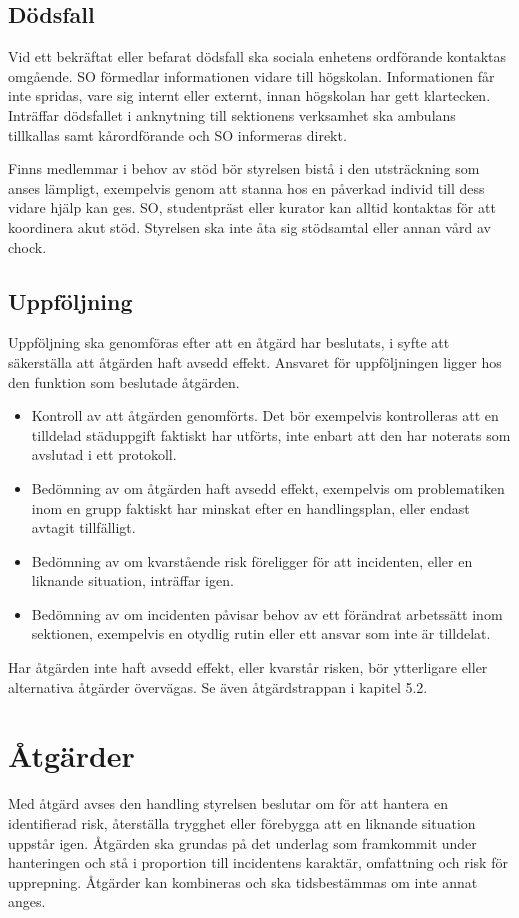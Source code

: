 \subsection{Dödsfall}
Vid ett bekräftat eller befarat dödsfall ska sociala enhetens ordförande kontaktas omgående. SO förmedlar informationen vidare till högskolan. Informationen får inte spridas, vare sig internt eller externt, innan högskolan har gett klartecken. Inträffar dödsfallet i anknytning till sektionens verksamhet ska ambulans tillkallas samt kårordförande och SO informeras direkt.

Finns medlemmar i behov av stöd bör styrelsen bistå i den utsträckning som anses lämpligt, exempelvis genom att stanna hos en påverkad individ till dess vidare hjälp kan ges. SO, studentpräst eller kurator kan alltid kontaktas för att koordinera akut stöd. Styrelsen ska inte åta sig stödsamtal eller annan vård av chock.

\subsection{Uppföljning}
Uppföljning ska genomföras efter att en åtgärd har beslutats, i syfte att säkerställa att åtgärden haft avsedd effekt. Ansvaret för uppföljningen ligger hos den funktion som beslutade åtgärden.
\begin{itemize}
\item Kontroll av att åtgärden genomförts. Det bör exempelvis kontrolleras att en tilldelad städuppgift faktiskt har utförts, inte enbart att den har noterats som avslutad i ett protokoll.
\item Bedömning av om åtgärden haft avsedd effekt, exempelvis om problematiken inom en grupp faktiskt har minskat efter en handlingsplan, eller endast avtagit tillfälligt.
\item Bedömning av om kvarstående risk föreligger för att incidenten, eller en liknande situation, inträffar igen.
\item Bedömning av om incidenten påvisar behov av ett förändrat arbetssätt inom sektionen, exempelvis en otydlig rutin eller ett ansvar som inte är tilldelat.
\end{itemize}
Har åtgärden inte haft avsedd effekt, eller kvarstår risken, bör ytterligare eller alternativa åtgärder övervägas. Se även åtgärdstrappan i kapitel 5.2.

\section{Åtgärder}
Med åtgärd avses den handling styrelsen beslutar om för att hantera en identifierad risk, återställa trygghet eller förebygga att en liknande situation uppstår igen. Åtgärden ska grundas på det underlag som framkommit under hanteringen och stå i proportion till incidentens karaktär, omfattning och risk för upprepning. Åtgärder kan kombineras och ska tidsbestämmas om inte annat anges.

